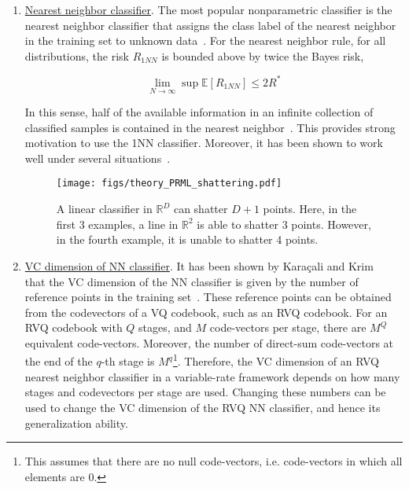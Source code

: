 \begin{enumerate}
\item \underline{Nearest neighbor classifier}.  The most popular nonparametric classifier is the nearest neighbor classifier that assigns the class label of the nearest neighbor in the training set to unknown data~\cite{2003_JNL_PRML_Karacali}.  For the nearest neighbor rule, for all distributions, the risk $R_{1NN}$ is bounded above by twice the Bayes risk,

\begin{equation}
\lim\limits_{N \rightarrow \infty} \sup\mathbb{E}\left[R_{1NN}\right] \leq 2R^*  
\end{equation}

In this sense, half of the available information in an infinite collection of classified samples is contained in the nearest neighbor~\cite{1967_JNL_PRML_Cover}.  This provides strong motivation to use the 1NN classifier.  Moreover, it has been shown to work well under several situations~\cite{1996_BOOK_PR_DevroyeGyorfiLugosi}.

								\begin{figure}[t]
								\centering
								\texttt{[image: figs/theory\_PRML\_shattering.pdf]}
								\caption{A linear classifier in $\mathbb{R}^D$ can shatter $D+1$ points.  Here, in the first 3 examples, a line in $\mathbb{R}^2$ is able to shatter 3 points.  However, in the fourth example, it is unable to shatter 4 points.}
								\label{fig:shattering}
								\end{figure}

\item \underline{VC dimension of NN classifier}.   It has been shown by Kara\c{c}ali and Krim~\cite{2003_JNL_PRML_Karacali} that the VC dimension of the NN classifier is given by the number of reference points in the training set~\cite{2005_CNF_ML_Angiulli}.  These reference points can be obtained from the codevectors of a VQ codebook, such as an RVQ codebook.  For an RVQ codebook with $Q$ stages, and $M$ code-vectors per stage, there are $M^Q$ equivalent code-vectors.  Moreover, the number of direct-sum code-vectors at the end of the $q$-th stage is $M^q$\footnote{This assumes that there are no null code-vectors, i.e. code-vectors in which all elements are 0.}.   Therefore, the VC dimension of an RVQ nearest neighbor classifier in a variable-rate framework depends on how many stages and codevectors per stage are used.  Changing these numbers can be used to change the VC dimension of the RVQ NN classifier, and hence its generalization ability.  
\end{enumerate}

